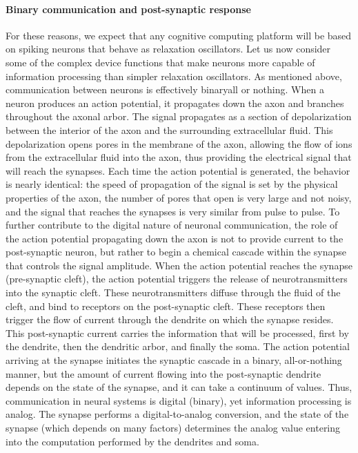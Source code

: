 \documentclass[twocolumn]{article}
\begin{document}
\paragraph{Binary communication and post-synaptic response}
For these reasons, we expect that any cognitive computing platform will be based on spiking neurons that behave as relaxation oscillators. Let us now consider some of the complex device functions that make neurons more capable of information processing than simpler relaxation oscillators. As mentioned above, communication between neurons is effectively binary\textemdash all or nothing. When a neuron produces an action potential, it propagates down the axon and branches throughout the axonal arbor. The signal propagates as a section of depolarization between the interior of the axon and the surrounding extracellular fluid. This depolarization opens pores in the membrane of the axon, allowing the flow of ions from the extracellular fluid into the axon, thus providing the electrical signal that will reach the synapses. Each time the action potential is generated, the behavior is nearly identical: the speed of propagation of the signal is set by the physical properties of the axon, the number of pores that open is very large and not noisy, and the signal that reaches the synapses is very similar from pulse to pulse. To further contribute to the digital nature of neuronal communication, the role of the action potential propagating down the axon is not to provide current to the post-synaptic neuron, but rather to begin a chemical cascade within the synapse that controls the signal amplitude. When the action potential reaches the synapse (pre-synaptic cleft), the action potential triggers the release of neurotransmitters into the synaptic cleft. These neurotransmitters diffuse through the fluid of the cleft, and bind to receptors on the post-synaptic cleft. These receptors then trigger the flow of current through the dendrite on which the synapse resides. This post-synaptic current carries the information that will be processed, first by the dendrite, then the dendritic arbor, and finally the soma. The action potential arriving at the synapse initiates the synaptic cascade in a binary, all-or-nothing manner, but the amount of current flowing into the post-synaptic dendrite depends on the state of the synapse, and it can take a continuum of values. Thus, communication in neural systems is digital (binary), yet information processing is analog. The synapse performs a digital-to-analog conversion, and the state of the synapse (which depends on many factors) determines the analog value entering into the computation performed by the dendrites and soma. 
\end{document}
